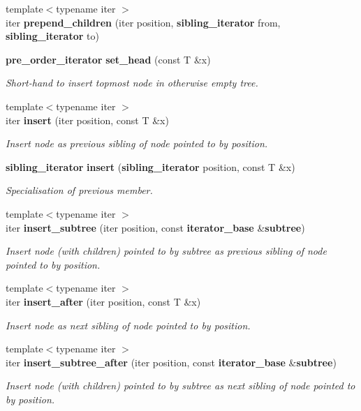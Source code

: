 \begin{DoxyCompactItemize}
{\footnotesize template$<$typename iter $>$ }\\iter {\bf prepend\+\_\+children} (iter position, {\bf sibling\+\_\+iterator} from, {\bf sibling\+\_\+iterator} to)
\item 
{\bf pre\+\_\+order\+\_\+iterator} {\bf set\+\_\+head} (const T \&x)
\begin{DoxyCompactList}\small\item\em Short-\/hand to insert topmost node in otherwise empty tree. \end{DoxyCompactList}\item 
{\footnotesize template$<$typename iter $>$ }\\iter {\bf insert} (iter position, const T \&x)
\begin{DoxyCompactList}\small\item\em Insert node as previous sibling of node pointed to by position. \end{DoxyCompactList}\item 
{\bf sibling\+\_\+iterator} {\bf insert} ({\bf sibling\+\_\+iterator} position, const T \&x)
\begin{DoxyCompactList}\small\item\em Specialisation of previous member. \end{DoxyCompactList}\item 
{\footnotesize template$<$typename iter $>$ }\\iter {\bf insert\+\_\+subtree} (iter position, const {\bf iterator\+\_\+base} \&{\bf subtree})
\begin{DoxyCompactList}\small\item\em Insert node (with children) pointed to by subtree as previous sibling of node pointed to by position. \end{DoxyCompactList}\item 
{\footnotesize template$<$typename iter $>$ }\\iter {\bf insert\+\_\+after} (iter position, const T \&x)
\begin{DoxyCompactList}\small\item\em Insert node as next sibling of node pointed to by position. \end{DoxyCompactList}\item 
{\footnotesize template$<$typename iter $>$ }\\iter {\bf insert\+\_\+subtree\+\_\+after} (iter position, const {\bf iterator\+\_\+base} \&{\bf subtree})
\begin{DoxyCompactList}\small\item\em Insert node (with children) pointed to by subtree as next sibling of node pointed to by position. \end{DoxyCompactList}\item 

\end{DoxyCompactItemize}
